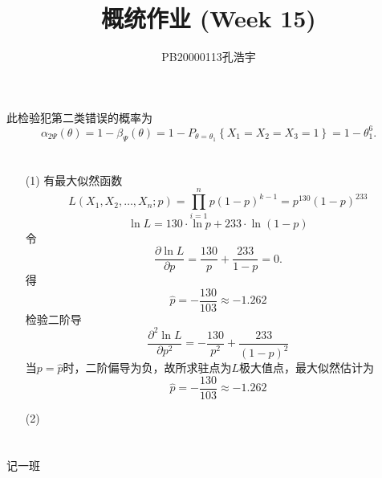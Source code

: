 \documentclass{article}
\title{概统作业 (Week 15)}
\author{PB20000113孔浩宇}
\begin{document}
\maketitle
\section{}  %
此检验犯第二类错误的概率为
\[
    \alpha_{2\Psi} (\theta)
    = 1 - \beta_{\Psi} (\theta)
    = 1 - P_{\theta = \theta_1} \left\{ X_1 = X_2 = X_3 = 1 \right\}    
    = 1 - \theta_1^6 .
\]

\section{}  %
\begin{enumerate}
    \item [(1)]有最大似然函数
    \[
        L(X_1, X_2, \ldots, X_{n} ; p)
        = \prod\limits_{i=1}^{n} p {(1-p)}^{k-1}
        = p^{130} {(1-p)}^{233}
    \]
    \[
        \ln L
        = 130\cdot \ln p + 233\cdot \ln (1-p)    
    \]
    令
    \[
        \frac{\partial \ln L}{\partial p}
        = \frac{130}{p} + \frac{233}{1-p} 
        = 0.   
    \]
    得
    \[
        \widehat{p} = -\frac{130}{103} \approx -1.262   
    \]
    检验二阶导
    \[
        \frac{\partial^2 \ln L}{\partial p^2}
        = -\frac{130}{p^2} + \frac{233}{{(1-p)}^2} 
    \]
    当$p = \widehat{p}$时，二阶偏导为负，故所求驻点为$L$极大值点，最大似然估计为
    \[
        \widehat{p} = -\frac{130}{103} \approx -1.262  
    \]
    \item [(2)]
\end{enumerate}

\section{}  %
记一班
\end{document}
